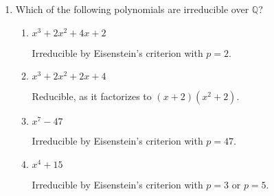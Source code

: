 \documentclass[12pt]{article}
\newcommand{\QQ}{\mathbb{Q}}
\begin{document}
\begin{enumerate}
    \item Which of the following polynomials are irreducible over $\QQ$?
    \begin{enumerate}
        \item $x^3+2x^2+4x+2$ \par
            Irreducible by Eisenstein's criterion with $p = 2$.
        \item $x^3+2x^2+2x+4$ \par
            Reducible, as it factorizes to $(x + 2)(x^2 + 2)$.
        \item $x^7-47$ \par
            Irreducible by Eisenstein's criterion with $p = 47$.
        \item $x^4+15$ \par
            Irreducible by Eisenstein's criterion with $p = 3$ or $p = 5$.
    \end{enumerate}
\end{enumerate}
\end{document}

